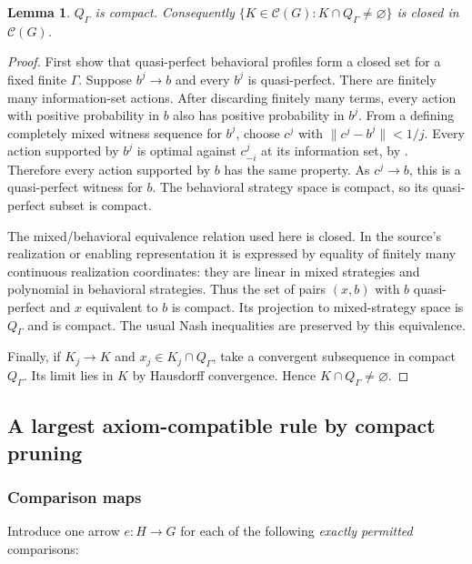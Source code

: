 \documentclass[11pt]{article}
\newtheorem{lemma}[theorem]{Lemma}
\theoremstyle{definition}
\newcommand{\CC}{\mathscr C}
\begin{document}
\begin{lemma}\label{lem:qpcompact}
$Q_\Gamma$ is compact. Consequently
$\{K\in\CC(G):K\cap Q_\Gamma\ne\varnothing\}$ is closed in $\CC(G)$.
\end{lemma}
\begin{proof}
First show that quasi-perfect behavioral profiles form a closed set for a
fixed finite $\Gamma$. Suppose $b^j\to b$ and every $b^j$ is quasi-perfect.
There are finitely many information-set actions. After discarding finitely
many terms, every action with positive probability in $b$ also has positive
probability in $b^j$. From a defining completely mixed witness sequence for
$b^j$, choose $c^j$ with $\|c^j-b^j\|<1/j$. Every action supported by $b^j$
is optimal against $c^j_{-i}$ at its information set, by
\cite[Definition 2.1]{gw}. Therefore every action supported by $b$ has the same
property. As $c^j\to b$, this is a quasi-perfect witness for $b$.
The behavioral strategy space is compact, so its quasi-perfect subset is
compact.

The mixed/behavioral equivalence relation used here is closed. In the source's
realization or enabling representation it is expressed by equality of finitely
many continuous realization coordinates: they are linear in mixed strategies
and polynomial in behavioral strategies. Thus the set of pairs $(x,b)$ with
$b$ quasi-perfect and $x$ equivalent to $b$ is compact. Its projection to
mixed-strategy space is $Q_\Gamma$ and is compact. The usual Nash inequalities
are preserved by this equivalence.

Finally, if $K_j\to K$ and $x_j\in K_j\cap Q_\Gamma$, take a convergent
subsequence in compact $Q_\Gamma$. Its limit lies in $K$ by Hausdorff
convergence. Hence $K\cap Q_\Gamma\ne\varnothing$.
\end{proof}

\subsection{A largest axiom-compatible rule by compact pruning}\label{sec:pruning}
\subsubsection{Comparison maps}
Introduce one arrow $e:H\to G$ for each of the following \emph{exactly
permitted} comparisons:
\end{document}
